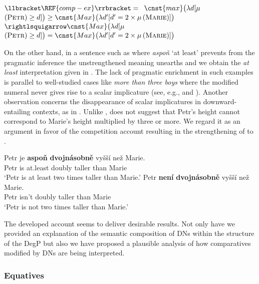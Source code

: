 \documentclass[output=paper,
modfonts,
hidelinks,
newtxmath
]{langscibook}
\begin{document}
\ea\label{tree-comp-dvojnasobne-semantics} $\llbracket \REF{comp-ex}\rrbracket ={}$
\ea $\cnst{max}\big(\lambda d[\mu$$(\textsc{Petr})\geq d]\big) \geq \cnst{Max}\big(\lambda d'[d'=2 \times \mu$$(\textsc{Marie})]\big)$\label{tree-comp-dvojnasobne-semantics-a}
\ex $\rightlsquigarrow\cnst{Max}\big(\lambda d[\mu$$(\textsc{Petr})\geq d]\big) = \cnst{Max}\big(\lambda d'[d'=2 \times \mu$$(\textsc{Marie})]\big)$\label{tree-comp-dvojnasobne-semantics-b}
\z \z

\noindent On the other hand, in a sentence such as  where \textit{aspoň} `at least' prevents from the pragmatic inference the unstrengthened meaning unearths and we obtain the \textit{at least} interpretation given in . The lack of pragmatic enrichment in such examples is parallel to well-studied cases like \textit{more than three boys} where the modified numeral never gives rise to a scalar implicature (see, e.g., \citealt{krifka_at_1999} and \citealt{schulz_pragmatic_2006}). Another observation concerns the disappearance of scalar implicatures in downward-entailing contexts, as in . Unlike ,  does not suggest that Petr's height cannot correspond to Marie's height multiplied by three or more. We regard it as an argument in favor of the competition account resulting in the strengthening of  to .

\ea \ea \gll\label{aspon}Petr je \textbf{aspoň} \textbf{dvojnásobně} vyšší než Marie.\label{comp-at-least}\\
Petr is at.least doubly taller than Marie\\
\glt `Petr is at least two times taller than Marie.'
\ex \gll \label{neni}Petr \textbf{není} \textbf{dvojnásobně} vyšší než Marie.\\
Petr isn't doubly taller than Marie\\
\glt `Petr is not two times taller than Marie.'
\z \z

\noindent The developed account seems to deliver desirable results. Not only have we provided an explanation of the semantic composition of DNs within the structure of the DegP but also we have proposed a plausible analysis of how comparatives modified by DNs are being interpreted.

\subsubsection{Equatives}\label{equatives}
\end{document}
